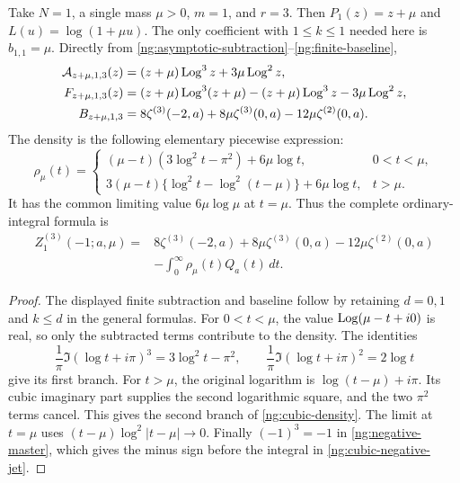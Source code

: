 Take $N=1$, a single mass $\mu>0$, $m=1$, and $r=3$.
Then $P_1(z)=z+\mu$ and $L(u)=\log(1+\mu u)$.
The only coefficient with $1\leq k\leq1$ needed here is
$b_{1,1}=\mu$.  Directly from
\eqref{ng:asymptotic-subtraction}--\eqref{ng:finite-baseline},
\begin{align}
 \mathcal A_{z+\mu,1,3}(z)
   &=(z+\mu)\operatorname{Log}^3z+3\mu\operatorname{Log}^2z,
 \label{ng:cubic-subtraction}\\
 F_{z+\mu,1,3}(z)
   &=(z+\mu)\operatorname{Log}^3(z+\mu)
          -(z+\mu)\operatorname{Log}^3z-3\mu\operatorname{Log}^2z,
 \label{ng:cubic-remainder}\\
 B_{z+\mu,1,3}
   &=8\zeta^{(3)}(-2,a)+8\mu\zeta^{(3)}(0,a)
                       -12\mu\zeta^{(2)}(0,a).
 \label{ng:cubic-baseline}
\end{align}
The density is the following elementary piecewise expression:
\begin{equation}
 \rho_\mu(t)=
 \begin{cases}
  (\mu-t)(3\log^2t-\pi^2)+6\mu\log t,
        &0<t<\mu,\\[3pt]
  3(\mu-t)\{\log^2t-\log^2(t-\mu)\}+6\mu\log t,
        &t>\mu.
 \end{cases}
 \label{ng:cubic-density}
\end{equation}
It has the common limiting value $6\mu\log\mu$ at $t=\mu$.
Thus the complete ordinary-integral formula is
\begin{equation}
 \begin{split}
 Z_1^{(3)}(-1;a,\mu)
   ={}&8\zeta^{(3)}(-2,a)+8\mu\zeta^{(3)}(0,a)
                          -12\mu\zeta^{(2)}(0,a)\\
      &-\int_0^{\infty}\rho_\mu(t)Q_a(t)\,dt.
 \end{split}
 \label{ng:cubic-negative-jet}
\end{equation}

\begin{proof}
The displayed finite subtraction and baseline follow by
retaining $d=0,1$ and $k\leq d$ in the general formulas.
For $0<t<\mu$, the value $\operatorname{Log}(\mu-t+i0)$ is real, so only
the subtracted terms contribute to the density.  The identities
\[
 \frac1\pi\Im(\log t+i\pi)^3=3\log^2t-\pi^2,
 \qquad
 \frac1\pi\Im(\log t+i\pi)^2=2\log t
\]
give its first branch.  For $t>\mu$, the original logarithm
is $\log(t-\mu)+i\pi$.  Its cubic imaginary part supplies the
second logarithmic square, and the two $\pi^2$ terms cancel.
This gives the second branch of \eqref{ng:cubic-density}.
The limit at $t=\mu$ uses
$(t-\mu)\log^2|t-\mu|\to0$.
Finally $(-1)^3=-1$ in \eqref{ng:negative-master}, which gives
the minus sign before the integral in
\eqref{ng:cubic-negative-jet}.
\end{proof}

